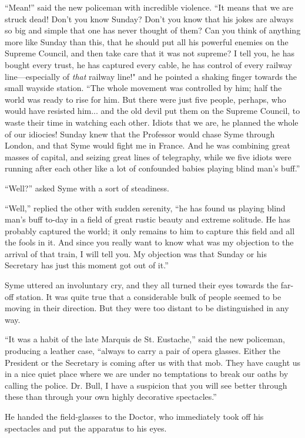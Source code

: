 \documentclass{book}
\begin{document}
“Mean!” said the new policeman with incredible violence. “It means that we are struck dead! Don’t you know Sunday? Don’t you know that his jokes are always so big and simple that one has never thought of them? Can you think of anything more like Sunday than this, that he should put all his powerful enemies on the Supreme Council, and then take care that it was not supreme? I tell you, he has bought every trust, he has captured every cable, he has control of every railway line—especially of \emph{that} railway line!" and he pointed a shaking finger towards the small wayside station. “The whole movement was controlled by him; half the world was ready to rise for him. But there were just five people, perhaps, who would have resisted him... and the old devil put them on the Supreme Council, to waste their time in watching each other. Idiots that we are, he planned the whole of our idiocies! Sunday knew that the Professor would chase Syme through London, and that Syme would fight me in France. And he was combining great masses of capital, and seizing great lines of telegraphy, while we five idiots were running after each other like a lot of confounded babies playing blind man’s buff.”

“Well?” asked Syme with a sort of steadiness.

“Well,” replied the other with sudden serenity, “he has found us playing blind man’s buff to-day in a field of great rustic beauty and extreme solitude. He has probably captured the world; it only remains to him to capture this field and all the fools in it. And since you really want to know what was my objection to the arrival of that train, I will tell you. My objection was that Sunday or his Secretary has just this moment got out of it.”

Syme uttered an involuntary cry, and they all turned their eyes towards the far-off station. It was quite true that a considerable bulk of people seemed to be moving in their direction. But they were too distant to be distinguished in any way.

“It was a habit of the late Marquis de St. Eustache,” said the new policeman, producing a leather case, “always to carry a pair of opera glasses. Either the President or the Secretary is coming after us with that mob. They have caught us in a nice quiet place where we are under no temptations to break our oaths by calling the police. Dr. Bull, I have a suspicion that you will see better through these than through your own highly decorative spectacles.”

He handed the field-glasses to the Doctor, who immediately took off his spectacles and put the apparatus to his eyes.
\end{document}
